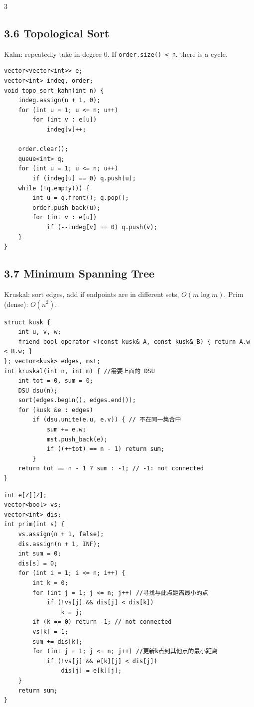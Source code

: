 \documentclass[8pt]{extarticle}
\begin{document}
\begin{multicols*}{3}
\subsection*{3.6 Topological Sort}

Kahn: repeatedly take in-degree 0. If \texttt{order.size() < n}, there is a cycle.


\begin{lstlisting}
vector<vector<int>> e;
vector<int> indeg, order;
void topo_sort_kahn(int n) {
    indeg.assign(n + 1, 0);
    for (int u = 1; u <= n; u++)
        for (int v : e[u])
            indeg[v]++;

    order.clear();
    queue<int> q;
    for (int u = 1; u <= n; u++)
        if (indeg[u] == 0) q.push(u);
    while (!q.empty()) {
        int u = q.front(); q.pop();
        order.push_back(u);
        for (int v : e[u])
            if (--indeg[v] == 0) q.push(v);
    }
}
\end{lstlisting}

\subsection*{3.7 Minimum Spanning Tree}

Kruskal: sort edges, add if endpoints are in different sets, $O(m \log m)$. Prim (dense): $O(n^2)$.


\begin{lstlisting}
struct kusk {
    int u, v, w;
    friend bool operator <(const kusk& A, const kusk& B) { return A.w < B.w; }
}; vector<kusk> edges, mst;
int kruskal(int n, int m) { //需要上面的 DSU
    int tot = 0, sum = 0;
    DSU dsu(n);
    sort(edges.begin(), edges.end());
    for (kusk &e : edges)
        if (dsu.unite(e.u, e.v)) { // 不在同一集合中
            sum += e.w;
            mst.push_back(e);
            if ((++tot) == n - 1) return sum;
        }
    return tot == n - 1 ? sum : -1; // -1: not connected
}
\end{lstlisting}

\begin{lstlisting}
int e[Z][Z];
vector<bool> vs;
vector<int> dis;
int prim(int s) {
    vs.assign(n + 1, false);
    dis.assign(n + 1, INF);
    int sum = 0;
    dis[s] = 0;
    for (int i = 1; i <= n; i++) {
        int k = 0;
        for (int j = 1; j <= n; j++) //寻找与此点距离最小的点
            if (!vs[j] && dis[j] < dis[k])
                k = j;
        if (k == 0) return -1; // not connected
        vs[k] = 1;
        sum += dis[k];
        for (int j = 1; j <= n; j++) //更新k点到其他点的最小距离
            if (!vs[j] && e[k][j] < dis[j])
                dis[j] = e[k][j];
    }
    return sum;
}
\end{lstlisting}


\end{multicols*}
\end{document}
